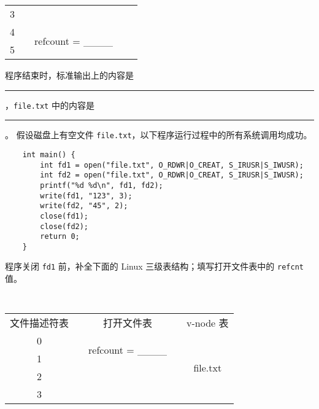 \begin{problems}
\begin{table}[H]
\begin{tabular}{ccccc}
                \multicolumn{1}{|c|}{3} &  &  & \multicolumn{1}{c|}{} & \multicolumn{1}{c|}{} \\ \cline{1-1} \cline{3-3}
                \multicolumn{1}{|c|}{4} & \multicolumn{1}{c|}{} & \multicolumn{1}{c|}{\multirow{2}{*}{refcount = \_\_\_\_}} & \multicolumn{1}{c|}{} & \multicolumn{1}{c|}{} \\ \cline{1-1}
                \multicolumn{1}{|c|}{5} & \multicolumn{1}{c|}{} & \multicolumn{1}{c|}{} & \multicolumn{1}{c|}{} & \multicolumn{1}{c|}{} \\ \cline{1-1} \cline{3-3} \cline{5-5} 
            \end{tabular}
        \end{table}
        \qn 程序结束时，标准输出上的内容是 \rule{3.5cm}{0.25mm}，\verb|file.txt| 中的内容是 \rule{3.5cm}{0.25mm}。
        \pro 假设磁盘上有空文件 \verb|file.txt|，以下程序运行过程中的所有系统调用均成功。
        \begin{verbatim}
    int main() {
        int fd1 = open("file.txt", O_RDWR|O_CREAT, S_IRUSR|S_IWUSR); 
        int fd2 = open("file.txt", O_RDWR|O_CREAT, S_IRUSR|S_IWUSR); 
        printf("%d %d\n", fd1, fd2);
        write(fd1, "123", 3);
        write(fd2, "45", 2);
        close(fd1);
        close(fd2);
        return 0;
    }
        \end{verbatim}
        \qn 程序关闭 \verb|fd1| 前，补全下面的 Linux 三级表结构；填写打开文件表中的 \verb|refcnt| 值。
        \begin{table}[H]
            \tt
            \centering
            \begin{tabular}{ccccc}
                文件描述符表 & {\qquad \qquad \qquad} & 打开文件表 & {\qquad \qquad \qquad} & v-node 表 \\ \cline{1-1} \cline{3-3} \cline{5-5} 
                \multicolumn{1}{|c|}{0} & \multicolumn{1}{c|}{} & \multicolumn{1}{c|}{\multirow{2}{*}{refcount = \_\_\_\_}} & \multicolumn{1}{c|}{} & \multicolumn{1}{c|}{\multirow{6}{*}{file.txt}} \\ \cline{1-1}
                \multicolumn{1}{|c|}{1} & \multicolumn{1}{c|}{} & \multicolumn{1}{c|}{} & \multicolumn{1}{c|}{} & \multicolumn{1}{c|}{} \\ \cline{1-1} \cline{3-3}
                \multicolumn{1}{|c|}{2} &  &  & \multicolumn{1}{c|}{} & \multicolumn{1}{c|}{} \\ \cline{1-1}
                \multicolumn{1}{|c|}{3} &  &  & \multicolumn{1}{c|}{} & \multicolumn{1}{c|}{} \\ \cline{1-1} \cline{3-3}

\end{tabular}
\end{table}
\end{problems}
